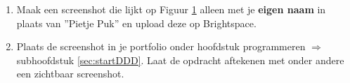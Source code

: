 \begin{enumerate} [label=\alph*]
\begin{enumerate} [label=\roman*]
\begin{figure}[h!]
		 	\centering
		 	\caption{Weergave van twee objecten van de klasse Led.}
		 	\label{fig:dddLeds}
		 \end{figure}
\end{enumerate}
	 \item Maak een screenshot die lijkt op Figuur \ref{fig:dddLeds} alleen met je \textbf{eigen naam} in plaats van ''Pietje Puk'' en upload deze op Brightspace.
	 \item Plaats de screenshot in je portfolio onder hoofdstuk programmeren $\Longrightarrow$ subhoofdstuk \ref{sec:startDDD}. Laat de opdracht aftekenen met onder andere een zichtbaar screenshot.
 
\end{enumerate}

